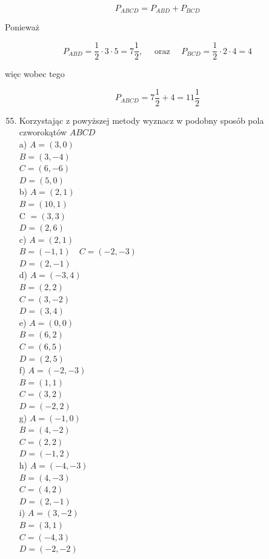 \documentclass[10pt]{article}
\begin{document}
\[
P_{A B C D}=P_{A B D}+P_{B C D}
\]

Ponieważ

\[
P_{A B D}=\frac{1}{2} \cdot 3 \cdot 5=7 \frac{1}{2}, \quad \text { oraz } \quad P_{B C D}=\frac{1}{2} \cdot 2 \cdot 4=4
\]

więc wobec tego

\[
P_{A B C D}=7 \frac{1}{2}+4=11 \frac{1}{2}
\]

\begin{enumerate}
  \setcounter{enumi}{54}
  \item Korzystając z powyższej metody wyznacz w podobny sposób pola czworokątów \(A B C D\)\\
a) \(A=(3,0)\)\\
\(B=(3,-4)\)\\
\(C=(6,-6)\)\\
\(D=(5,0)\)\\
b) \(A=(2,1)\)\\
\(B=(10,1)\)\\
C \(=(3,3)\)\\
\(D=(2,6)\)\\
c) \(A=(2,1)\)\\
\(B=(-1,1) \quad C=(-2,-3)\)\\
\(D=(2,-1)\)\\
d) \(A=(-3,4)\)\\
\(B=(2,2)\)\\
\(C=(3,-2)\)\\
\(D=(3,4)\)\\
e) \(A=(0,0)\)\\
\(B=(6,2)\)\\
\(C=(6,5)\)\\
\(D=(2,5)\)\\
f) \(A=(-2,-3)\)\\
\(B=(1,1)\)\\
\(C=(3,2)\)\\
\(D=(-2,2)\)\\
g) \(A=(-1,0)\)\\
\(B=(4,-2)\)\\
\(C=(2,2)\)\\
\(D=(-1,2)\)\\
h) \(A=(-4,-3)\)\\
\(B=(4,-3)\)\\
\(C=(4,2)\)\\
\(D=(2,-1)\)\\
i) \(A=(3,-2)\)\\
\(B=(3,1)\)\\
\(C=(-4,3)\)\\
\(D=(-2,-2)\)
\end{enumerate}
\end{document}
